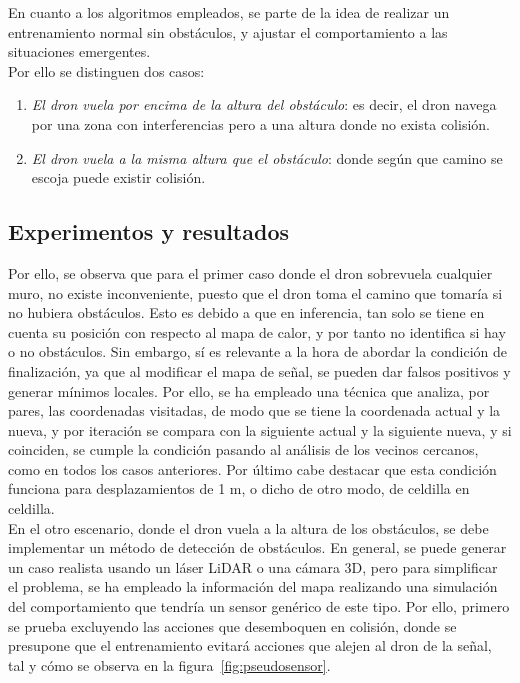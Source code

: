 En cuanto a los algoritmos empleados, se parte de la idea de realizar un entrenamiento normal sin obstáculos, y ajustar el comportamiento a las situaciones emergentes.\\

Por ello se distinguen dos casos:

\begin{enumerate}
    \item \emph{El dron vuela por encima de la altura del obstáculo}: es decir, el dron navega por una zona con interferencias pero a una altura donde no exista colisión.
    \item \emph{El dron vuela a la misma altura que el obstáculo}: donde según que camino se escoja puede existir colisión.
\end{enumerate}

\subsection{Experimentos y resultados}
\label{subsec:experimentos_sfo}

Por ello, se observa que para el primer caso donde el dron sobrevuela cualquier muro, no existe inconveniente, puesto que el dron toma el camino que tomaría si no hubiera obstáculos. Esto es debido a que en inferencia, tan solo se tiene en cuenta su posición con respecto al mapa de calor, y por tanto no identifica si hay o no obstáculos. Sin embargo, sí es relevante a la hora de abordar la condición de finalización, ya que al modificar el mapa de señal, se pueden dar falsos positivos y generar mínimos locales. Por ello, se ha empleado una técnica que analiza, por pares, las coordenadas visitadas, de modo que se tiene la coordenada actual y la nueva, y por iteración se compara con la siguiente actual y la siguiente nueva, y si coinciden, se cumple la condición pasando al análisis de los vecinos cercanos, como en todos los casos anteriores. Por último cabe destacar que esta condición funciona para desplazamientos de 1 m, o dicho de otro modo, de celdilla en celdilla.\\

En el otro escenario, donde el dron vuela a la altura de los obstáculos, se debe implementar un método de detección de obstáculos. En general, se puede generar un caso realista usando un láser LiDAR o una cámara 3D, pero para simplificar el problema, se ha empleado la información del mapa realizando una simulación del comportamiento que tendría un sensor genérico de este tipo. Por ello, primero se prueba excluyendo las acciones que desemboquen en colisión, donde se presupone que el entrenamiento evitará acciones que alejen al dron de la señal, tal y cómo se observa en la figura~\ref{fig:pseudosensor}.\\

